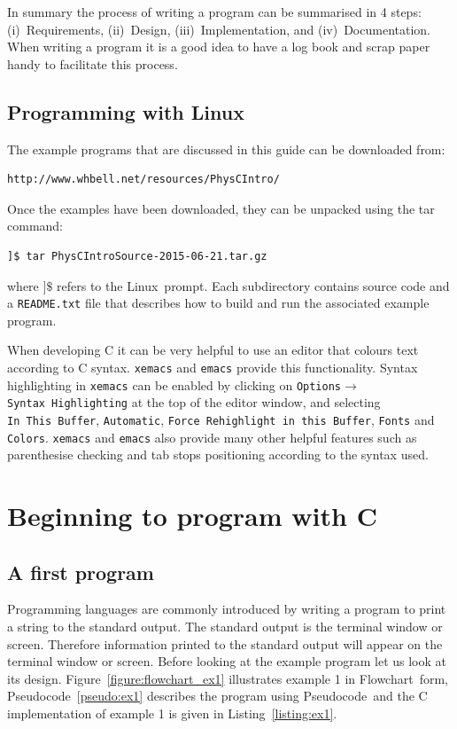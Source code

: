 \documentclass[11pt]{scrartcl}
\def\psc{Pseudocode}
\def\flo{Flowchart}
\def\linux{Linux}
\begin{document}
In summary the process of writing a program can be summarised in 4
steps: (i)~Requirements, (ii)~Design, (iii)~Implementation, and 
(iv)~Documentation.  When writing a program it is a good idea to have
a log book and scrap paper handy to facilitate this process.

\subsection{Programming with Linux}
The example programs that are discussed in this guide can be downloaded from:
\begin{verbatim}
http://www.whbell.net/resources/PhysCIntro/
\end{verbatim}
Once the examples have been downloaded, they can be unpacked using the tar command:
\begin{verbatim}
]$ tar PhysCIntroSource-2015-06-21.tar.gz
\end{verbatim} %
where \texttt{$]\$$} refers to the \linux\ prompt.  Each subdirectory contains source code and a \texttt{README.txt} file that describes how to build and run the associated example program.

When developing C it can be very helpful to use an editor that colours
text according to C syntax.  \texttt{xemacs} and \texttt{emacs} provide this
functionality.  Syntax highlighting in \texttt{xemacs} can be enabled by
clicking on \texttt{Options$\rightarrow$Syntax~Highlighting} at the
top of the editor window, and selecting \texttt{In~This~Buffer},
\texttt{Automatic}, \texttt{Force~Rehighlight~in~this~Buffer},
\texttt{Fonts} and \texttt{Colors}.  \texttt{xemacs} and
\texttt{emacs} also provide 
many other helpful features such as parenthesise checking and tab stops
positioning according to the syntax used.


\section{Beginning to program with C}

\subsection{A first program}

Programming languages are commonly introduced by writing a program to
print a string to the standard output.  The standard output is the
terminal window or screen.  Therefore information printed to the
standard output will appear on the terminal window or screen.  Before
looking at the example program let us look at its design.
Figure~\ref{figure:flowchart_ex1} illustrates example 1 in \flo\
form, \psc~\ref{pseudo:ex1} describes the program using
\psc\ and the C implementation of example 1 is given in
Listing~\ref{listing:ex1}.
\end{document}

